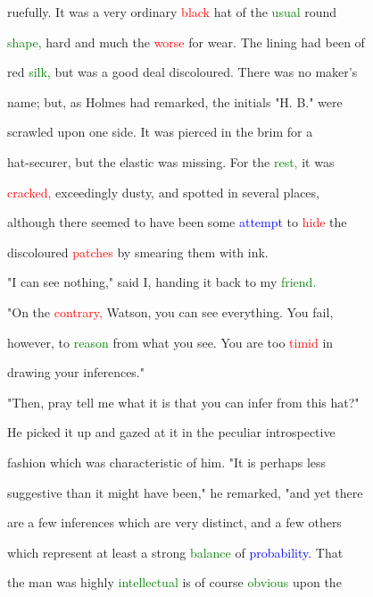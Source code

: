  ruefully. It was a very ordinary \textcolor{red}{black} hat of the \textcolor{green}{usual} round

 \textcolor{green}{shape,} hard and much the \textcolor{red}{worse} for \textcolor{BurntOrange}{wear.} The lining had been of

 red \textcolor{green}{silk,} but was a \textcolor{BurntOrange}{good} \textcolor{BurntOrange}{deal} discoloured. There was no maker's

 name; but, as Holmes had remarked, the initials "H. B." were

 scrawled upon one side. It was pierced in the brim for a

 hat-securer, but the elastic was missing. For the \textcolor{green}{rest,} it was

 \textcolor{red}{cracked,} exceedingly dusty, and spotted in several places,

 although there seemed to have been some \textcolor{blue}{attempt} to \textcolor{red}{hide} the

 discoloured \textcolor{red}{patches} by smearing them with ink.



 "I can see nothing," said I, handing it back to my \textcolor{green}{friend.}



 "On the \textcolor{red}{contrary,} Watson, you can see everything. You fail,

 however, to \textcolor{green}{reason} from what you see. You are too \textcolor{red}{timid} in

 drawing your inferences."



 "Then, \textcolor{BurntOrange}{pray} tell me what it is that you can infer from this hat?"



 He picked it up and gazed at it in the peculiar introspective

 fashion which was characteristic of him. "It is perhaps less

 suggestive than it might have been," he remarked, "and yet there

 are a few inferences which are very distinct, and a few others

 which represent at least a strong \textcolor{green}{balance} of \textcolor{blue}{probability.} That

 the man was highly \textcolor{green}{intellectual} is of course \textcolor{green}{obvious} upon the

